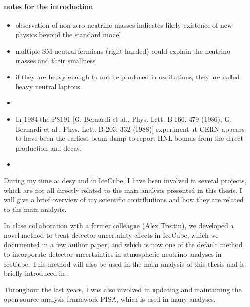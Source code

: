 \paragraph{notes for the introduction}
\begin{itemize}
    \item observation of non-zero neutrino masses indicates likely existence of new physics beyond the standard model
    \item multiple SM neutral fermions (right handed) could explain the neutrino masses and their smallness
    \item if they are heavy enough to not be produced in oscillations, they are called heavy neutral laptons
    \item 
    \item In 1984 the PS191 [G. Bernardi et al., Phys. Lett. B 166, 479 (1986), G. Bernardi et al., Phys. Lett. B 203, 332 (1988)] experiment at CERN appears to have been the earliest beam dump to report HNL bounds from the direct production and decay.
    \item 
\end{itemize}




During my time at desy and in IceCube, I have been involved in several projects, which are not all directly related to the main analysis presented in this thesis. I will give a brief overview of my scientific contributions and how they are related to the main analysis.

In close collaboration with a former colleague (Alex Trettin), we developed a novel method to treat detector uncertainty effects in IceCube, which we documented in a few author paper, and which is now one of the default method to incorporate detector uncertainties in atmospheric neutrino analyses in IceCube. This method will also be used in the main analysis of this thesis and is briefly introduced in .

Throughout the last years, I was also involved in updating and maintaining the open source analysis framework PISA, which is used in many analyses.



